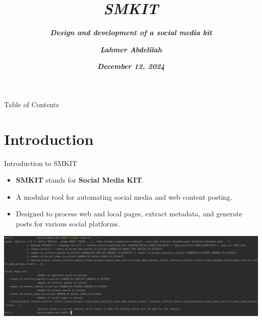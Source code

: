 \documentclass{beamer}
\title{ \textbf{ \textit{SMKIT} } }
\subtitle{ \textbf{ \textit{Design and development of a social media kit} } }
\author[ \textbf{ \textit{Abdelilah Lahmer} } ]{ \textbf{ \textit{Lahmer Abdelilah} } }
\date{ \textbf{ \textit{December 12, 2024} } }
\begin{document}
\frame{\titlepage}

\begin{frame}{Table of Contents}
    \tableofcontents    
\end{frame}


\section{Introduction}
    \begin{frame}{Introduction to SMKIT}
        \vspace{0.5cm}
        \begin{itemize}
            \item \textbf{SMKIT} stands for \textbf{Social Media KIT}.
            \item A modular tool for automating social media and web content posting.
            \item Designed to process web and local pages, extract metadata, and generate posts for various social platforms.
        \end{itemize}

        \begin{center}
            \includegraphics[width=\textwidth, keepaspectratio]{images/introduction_and_motivation_introduction_to_smkit_slide_image.png}
        \end{center}
    \end{frame}
\end{document}
